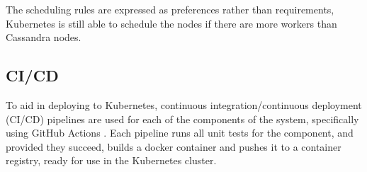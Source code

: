 The scheduling rules are expressed as preferences rather than requirements, Kubernetes is still able to schedule the nodes if there are more workers than Cassandra nodes.

\subsection{CI/CD}
To aid in deploying to Kubernetes, continuous integration/continuous deployment (CI/CD) pipelines are used for each of the components of the system, specifically using GitHub Actions \cite{githubactions}. Each pipeline runs all unit tests for the component, and provided they succeed, builds a docker container and pushes it to a container registry, ready for use in the Kubernetes cluster.

